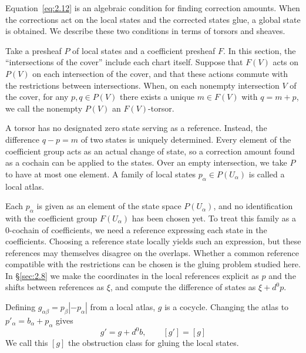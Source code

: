 Equation~\eqref{eq:2.12} is an algebraic condition for finding correction amounts. When
the corrections act on the local states and the corrected states glue, a global state is
obtained. We describe these two conditions in terms of torsors and sheaves.

\begin{definition}\label{def:2.20}

Take a presheaf $P$ of local states and a coefficient presheaf $F$. In this section, the
``intersections of the cover'' include each chart itself. Suppose that $F(V)$ acts on
$P(V)$ on each intersection of the cover, and that these actions commute with the
restrictions between intersections. When, on each nonempty intersection $V$ of the cover,
for any $p,q\in P(V)$ there exists a unique $m\in F(V)$ with $q=m+p$, we call the nonempty
$P(V)$ an $F(V)$-torsor.

A torsor has no designated zero state serving as a reference. Instead, the difference
$q-p=m$ of two states is uniquely determined. Every element of the coefficient group acts
as an actual change of state, so a correction amount found as a cochain can be applied to
the states. Over an empty intersection, we take $P$ to have at most one element. A family of local
states $p_\alpha\in P(U_\alpha)$ is called a local atlas.

Each $p_\alpha$ is given as an element of the state space $P(U_\alpha)$, and no
identification with the coefficient group $F(U_\alpha)$ has been chosen yet. To treat this
family as a 0-cochain of coefficients, we need a reference expressing each state in the
coefficients. Choosing a reference state locally yields such an expression, but these
references may themselves disagree on the overlaps. Whether a common reference compatible
with the restrictions can be chosen is the gluing problem studied here. In \S\ref{sec:2.8}
we make the coordinates in the local references explicit as $p$ and the shifts between
references as $\xi$, and compute the difference of states as $\xi+d^0p$.

\end{definition}

\begin{proposition}\label{prop:2.21}

Defining $g_{\alpha\beta}=p_\beta| -p_\alpha|$ from a local atlas, $g$ is a cocycle.
Changing the atlas to $p'_\alpha=b_\alpha+p_\alpha$ gives
\begin{equation*}
g'=g+d^0b,
\qquad [g']=[g]
\tag{2.14}\label{eq:2.14}
\end{equation*}
We call this $[g]$ the obstruction class for gluing the local states.

\end{proposition}

